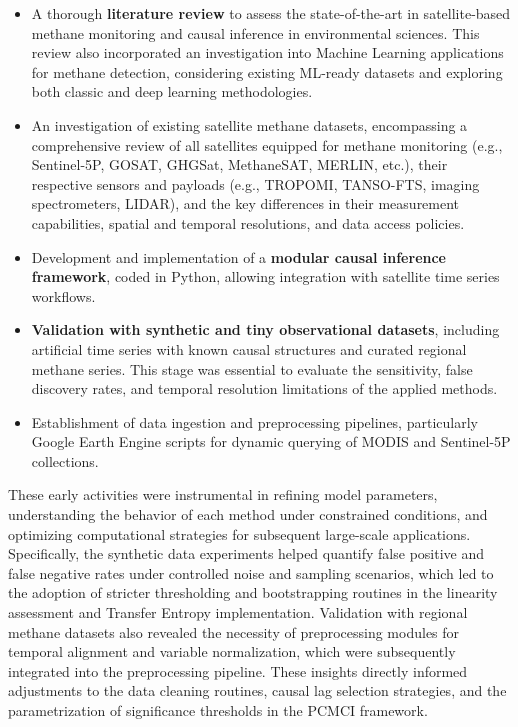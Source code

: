 \begin{itemize}
  \item A thorough \textbf{literature review} to assess the state-of-the-art in satellite-based methane monitoring and causal inference in environmental sciences. This review also incorporated an investigation into Machine Learning applications for methane detection, considering existing ML-ready datasets and exploring both classic and deep learning methodologies.
    \item An investigation of existing satellite methane datasets, encompassing a comprehensive review of all satellites equipped for methane monitoring (e.g., Sentinel-5P, GOSAT, GHGSat, MethaneSAT, MERLIN, etc.), their respective sensors and payloads (e.g., TROPOMI, TANSO-FTS, imaging spectrometers, LIDAR), and the key differences in their measurement capabilities, spatial and temporal resolutions, and data access policies.
  \item Development and implementation of a \textbf{modular causal inference framework}, coded in Python, allowing integration with satellite time series workflows.
  \item \textbf{Validation with synthetic and tiny observational datasets}, including artificial time series with known causal structures and curated regional methane series. This stage was essential to evaluate the sensitivity, false discovery rates, and temporal resolution limitations of the applied methods.
  \item Establishment of data ingestion and preprocessing pipelines, particularly Google Earth Engine scripts for dynamic querying of MODIS and Sentinel-5P collections.
\end{itemize}

These early activities were instrumental in refining model parameters, understanding the behavior of each method under constrained conditions, and optimizing computational strategies for subsequent large-scale applications. Specifically, the synthetic data experiments helped quantify false positive and false negative rates under controlled noise and sampling scenarios, which led to the adoption of stricter thresholding and bootstrapping routines in the linearity assessment and Transfer Entropy implementation. Validation with regional methane datasets also revealed the necessity of preprocessing modules for temporal alignment and variable normalization, which were subsequently integrated into the preprocessing pipeline. These insights directly informed adjustments to the data cleaning routines, causal lag selection strategies, and the parametrization of significance thresholds in the PCMCI framework.

